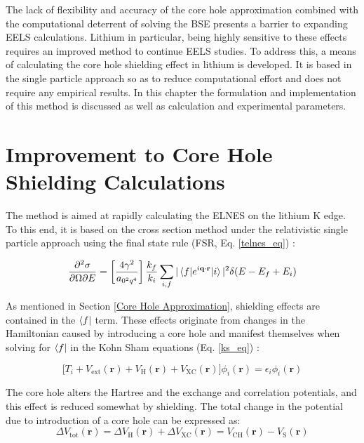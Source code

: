 




The lack of flexibility and accuracy of the core hole approximation combined with the computational deterrent of solving the BSE presents a barrier to expanding EELS calculations.  Lithium in particular, being highly sensitive to these effects requires an improved method to continue EELS studies.  To address this, a means of calculating the core hole shielding effect in lithium is developed.  It is based in the single particle approach so as to reduce computational effort and does not require any empirical results.  In this chapter the formulation and implementation of this method is discussed as well as calculation and experimental parameters. 


\section{Improvement to Core Hole Shielding Calculations}
The method is aimed at rapidly calculating the ELNES on the lithium K edge.   To this end, it is based on the cross section method under the relativistic single particle approach using the final state rule (FSR, Eq. \ref{telnes_eq}) \cite{jorissen2007ab}:

\begin{equation}
	\frac{\partial^2 \sigma}{\partial \Omega \partial E} = \left[\frac{4\gamma^2}{a_{\mathrm{0}^2q^4}}\right] \frac{k_f}{k_i} \sum_{i,f}|\mel{f}{e^{i\textbf{q}\cdot\textbf{r}}}{i}|^2\delta(E-E_f+E_i)
\end{equation}

As mentioned in Section \ref{Core Hole Approximation}, shielding effects are contained in the $\bra{f}$ term. These effects originate from changes in the Hamiltonian caused by introducing a core hole and manifest themselves when solving for $\bra{f}$ in the Kohn Sham equations (Eq. \ref{ks_eq}) \cite{kohn_self-consistent_1965}:  

\begin{equation}
    \bigg[T_i + V_{\mathrm{ext}}(\textbf{r}) + V_{\mathrm{H}}(\textbf{r}) + V_{\mathrm{XC}}(\textbf{r})\bigg] \phi_i(\textbf{r}) = \epsilon_i \phi_i(\textbf{r})
\end{equation}

The core hole alters the Hartree and the exchange and correlation potentials, and this effect is reduced somewhat by shielding.  The total change in the potential due to introduction of a core hole can be expressed as: 
\begin{equation}
\Delta V_{\mathrm{tot}}(\textbf{r})=\Delta V_{\mathrm{H}}(\textbf{r}) +\Delta V_{\mathrm{XC}}(\textbf{r})=V_{\mathrm{CH}}(\textbf{r}) - V_{\mathrm{S}}(\textbf{r})
\label{delta_potentials}
\end{equation}

